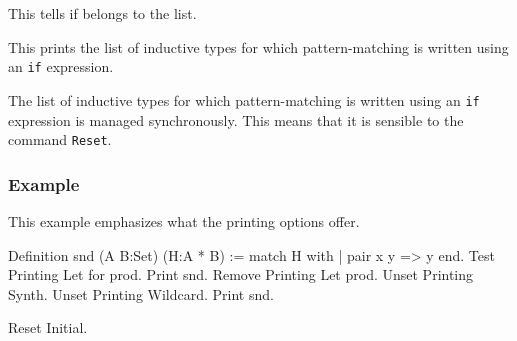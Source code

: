 \begin{quote}
{}
\end{quote}
This tells if {\ident} belongs to the list.

\begin{quote}
{}
\end{quote}
This prints the list of inductive types for which pattern-matching is
written using an {\tt if} expression.

The list of inductive types for which pattern-matching is written
using an {\tt if} expression is managed synchronously. This means that
it is sensible to the command {\tt Reset}.

\subsubsection{Example}

This example emphasizes what the printing options offer.

\begin{coq_example}
Definition snd (A B:Set) (H:A * B) := match H with
                                      | pair x y => y
                                      end.
Test Printing Let for prod.
Print snd.
Remove Printing Let prod.
Unset Printing Synth.
Unset Printing Wildcard.
Print snd.
\end{coq_example}
\begin{coq_eval}
Reset Initial.
\end{coq_eval}





